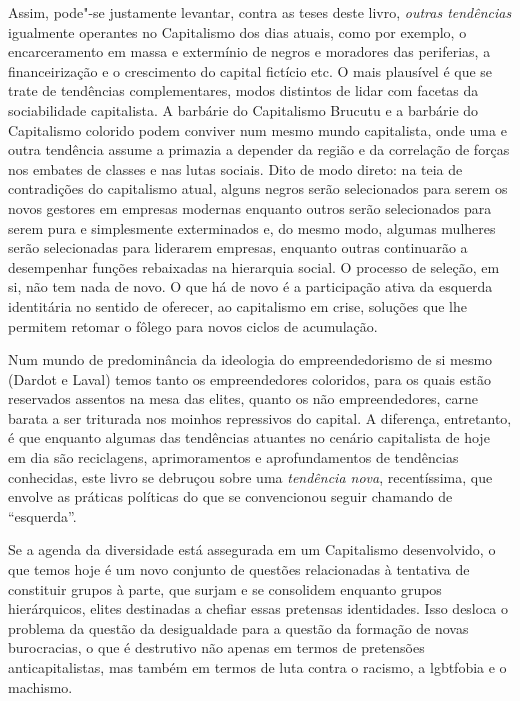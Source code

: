 Assim, pode"-se justamente levantar, contra as teses deste livro,
\emph{outras tendências} igualmente operantes no Capitalismo dos dias
atuais, como por exemplo, o encarceramento em massa e extermínio de
negros e moradores das periferias, a financeirização e o crescimento do
capital fictício etc. O mais plausível é que se trate de tendências
complementares, modos distintos de lidar com facetas da sociabilidade
capitalista. A barbárie do Capitalismo Brucutu e a barbárie do
Capitalismo colorido podem conviver num mesmo mundo capitalista, onde
uma e outra tendência assume a primazia a depender da região e da
correlação de forças nos embates de classes e nas lutas sociais. Dito de
modo direto: na teia de contradições do capitalismo atual, alguns negros
serão selecionados para serem os novos gestores em empresas modernas
enquanto outros serão selecionados para serem pura e simplesmente
exterminados e, do mesmo modo, algumas mulheres serão selecionadas para
liderarem empresas, enquanto outras continuarão a desempenhar funções
rebaixadas na hierarquia social. O processo de seleção, em si, não tem
nada de novo. O que há de novo é a participação ativa da esquerda
identitária no sentido de oferecer, ao capitalismo em crise, soluções
que lhe permitem retomar o fôlego para novos ciclos de acumulação.

Num mundo de predominância da ideologia do empreendedorismo de si mesmo
(Dardot e Laval) temos tanto os empreendedores coloridos, para os quais
estão reservados assentos na mesa das elites, quanto os não
empreendedores, carne barata a ser triturada nos moinhos repressivos do
capital. A diferença, entretanto, é que enquanto algumas das tendências
atuantes no cenário capitalista de hoje em dia são reciclagens,
aprimoramentos e aprofundamentos de tendências conhecidas, este livro se
debruçou sobre uma \emph{tendência nova}, recentíssima, que envolve as
práticas políticas do que se convencionou seguir chamando de
``esquerda''.

Se a agenda da diversidade está assegurada em um Capitalismo
desenvolvido, o que temos hoje é um novo conjunto de questões
relacionadas à tentativa de constituir grupos à parte, que surjam e se
consolidem enquanto grupos hierárquicos, elites destinadas a chefiar
essas pretensas identidades. Isso desloca o problema da questão da
desigualdade para a questão da formação de novas burocracias, o que é
destrutivo não apenas em termos de pretensões anticapitalistas, mas
também em termos de luta contra o racismo, a lgbtfobia e o machismo.

